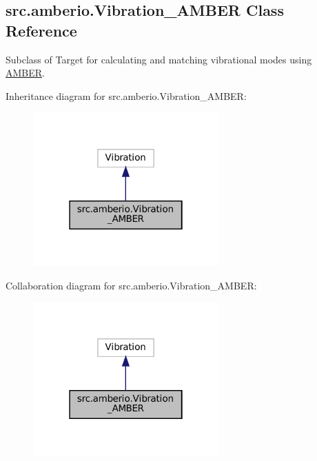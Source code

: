 \hypertarget{classsrc_1_1amberio_1_1Vibration__AMBER}{}\subsection{src.\+amberio.\+Vibration\+\_\+\+A\+M\+B\+ER Class Reference}
\label{classsrc_1_1amberio_1_1Vibration__AMBER}


Subclass of Target for calculating and matching vibrational modes using \hyperlink{classsrc_1_1amberio_1_1AMBER}{A\+M\+B\+ER}.  




Inheritance diagram for src.\+amberio.\+Vibration\+\_\+\+A\+M\+B\+ER\+:
\nopagebreak
\begin{figure}[H]
\begin{center}
\leavevmode
\includegraphics[width=202pt]{classsrc_1_1amberio_1_1Vibration__AMBER__inherit__graph}
\end{center}
\end{figure}


Collaboration diagram for src.\+amberio.\+Vibration\+\_\+\+A\+M\+B\+ER\+:
\nopagebreak
\begin{figure}[H]
\begin{center}
\leavevmode
\includegraphics[width=202pt]{classsrc_1_1amberio_1_1Vibration__AMBER__coll__graph}
\end{center}
\end{figure}
